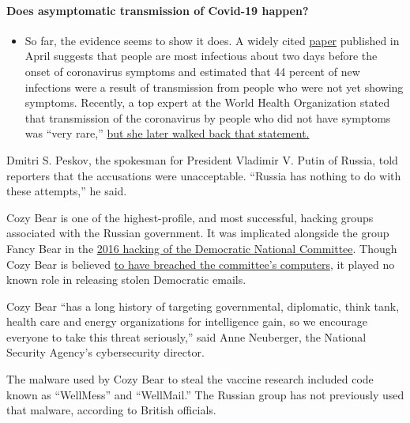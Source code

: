 \begin{itemize}
{  \paragraph{Does asymptomatic transmission of Covid-19
  happen?}\label{does-asymptomatic-transmission-of-covid-19-happen}}

  \begin{itemize}
  \tightlist
  \item
    So far, the evidence seems to show it does. A widely cited
    \href{https://www.nature.com/articles/s41591-020-0869-5}{paper}
    published in April suggests that people are most infectious about
    two days before the onset of coronavirus symptoms and estimated that
    44 percent of new infections were a result of transmission from
    people who were not yet showing symptoms. Recently, a top expert at
    the World Health Organization stated that transmission of the
    coronavirus by people who did not have symptoms was ``very rare,''
    \href{https://www.nytimes.com/2020/06/09/world/coronavirus-updates.html?action=click\&pgtype=Article\&state=default\&region=MAIN_CONTENT_3\&context=storylines_faq\#link-1f302e21}{but
    she later walked back that statement.}
  \end{itemize}
\end{itemize}

Dmitri S. Peskov, the spokesman for President Vladimir V. Putin of
Russia, told reporters that the accusations were unacceptable. ``Russia
has nothing to do with these attempts,'' he said.

Cozy Bear is one of the highest-profile, and most successful, hacking
groups associated with the Russian government. It was implicated
alongside the group Fancy Bear in the
\href{https://www.nytimes.com/2018/07/13/us/politics/mueller-indictment-russian-intelligence-hacking.html}{2016
hacking of the Democratic National Committee}. Though Cozy Bear is
believed
\href{https://www.nytimes.com/2019/01/18/technology/dnc-russian-hacking.html}{to
have breached the committee's computers}, it played no known role in
releasing stolen Democratic emails.

Cozy Bear ``has a long history of targeting governmental, diplomatic,
think tank, health care and energy organizations for intelligence gain,
so we encourage everyone to take this threat seriously,'' said Anne
Neuberger, the National Security Agency's cybersecurity director.

The malware used by Cozy Bear to steal the vaccine research included
code known as ``WellMess'' and ``WellMail.'' The Russian group has not
previously used that malware, according to British officials.

